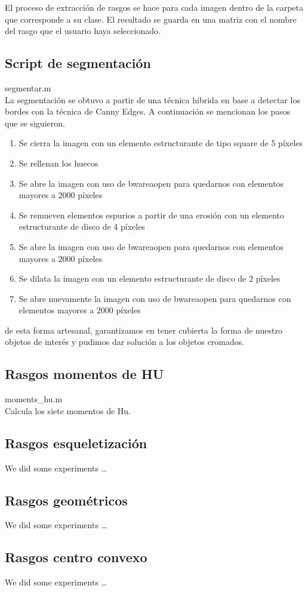 \documentclass[a4paper, 11pt]{article}
\begin{document}
El proceso de extracción de rasgos se hace para cada imagen dentro de la carpeta que corresponde a su clase. El resultado se guarda en una matriz con el nombre del rasgo que el usuario haya seleccionado.

\subsection{Script de segmentación}

segmentar.m\\

La segmentación se obtuvo a partir de una técnica hibrida en base a detectar los bordes con la técnica de Canny Edges. A continuación se mencionan los pasos que se siguieron.

\begin{enumerate}
\item Se cierra la imagen con un elemento estructurante de tipo square de 5 píxeles
\item Se rellenan los huecos
\item Se abre la imagen con uso de bwareaopen para quedarnos con elementos mayores a 2000 píxeles
\item Se remueven elementos espurios a partir de una erosión con un elemento estructurante de disco de 4 píxeles
\item Se abre la imagen con uso de bwareaopen para quedarnos con elementos mayores a 2000 píxeles
\item Se dilata la imagen con un elemento estructurante de disco de 2 píxeles
\item Se abre nuevamente la imagen con uso de bwareaopen para quedarnos con elementos mayores a 2000 píxeles
\end{enumerate}

de esta forma artesanal, garantizamos en tener cubierta la forma de nuestro objetos de interés y pudimos dar solución a los objetos cromados.

\subsection{Rasgos momentos de HU}

moments\_hu.m\\

Calcula los siete momentos de Hu.

\subsection{Rasgos esqueletización}

We did some experiments \ldots

\subsection{Rasgos geométricos}

We did some experiments \ldots

\subsection{Rasgos centro convexo}

We did some experiments \ldots


\pagebreak


\end{document}
